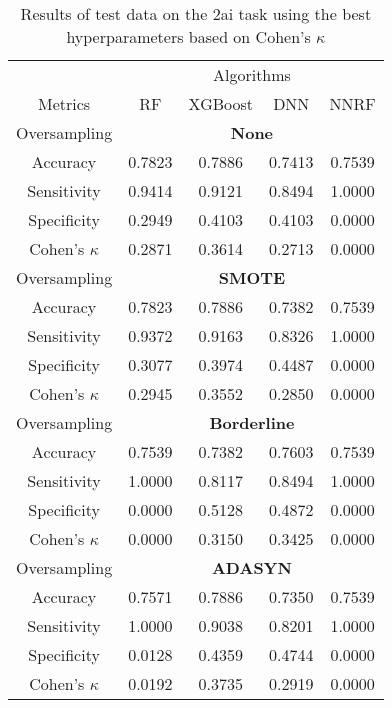 \begin{table}[!htb]
\centering
\caption{Results of test data on the 2ai task using the best hyperparameters based on Cohen's $\kappa$}
\label{tab:{task}_test_results}
\begin{tabular}{c | c c c c}
\hline
 & \multicolumn{4}{c}{Algorithms}\\ 
Metrics &RF & XGBoost & DNN & NNRF\\ 
\hline
Oversampling &\multicolumn{4}{|c}{\textbf{None}}\\ 
\hline
Accuracy & 0.7823 & 0.7886 & 0.7413 & 0.7539\\ 
Sensitivity & 0.9414 & 0.9121 & 0.8494 & 1.0000\\ 
Specificity & 0.2949 & 0.4103 & 0.4103 & 0.0000\\ 
Cohen's $\kappa$ & 0.2871 & 0.3614 & 0.2713 & 0.0000\\ 
\hline
Oversampling &\multicolumn{4}{|c}{\textbf{SMOTE}}\\ 
\hline
Accuracy & 0.7823 & 0.7886 & 0.7382 & 0.7539\\ 
Sensitivity & 0.9372 & 0.9163 & 0.8326 & 1.0000\\ 
Specificity & 0.3077 & 0.3974 & 0.4487 & 0.0000\\ 
Cohen's $\kappa$ & 0.2945 & 0.3552 & 0.2850 & 0.0000\\ 
\hline
Oversampling &\multicolumn{4}{|c}{\textbf{Borderline}}\\ 
\hline
Accuracy & 0.7539 & 0.7382 & 0.7603 & 0.7539\\ 
Sensitivity & 1.0000 & 0.8117 & 0.8494 & 1.0000\\ 
Specificity & 0.0000 & 0.5128 & 0.4872 & 0.0000\\ 
Cohen's $\kappa$ & 0.0000 & 0.3150 & 0.3425 & 0.0000\\ 
\hline
Oversampling &\multicolumn{4}{|c}{\textbf{ADASYN}}\\ 
\hline
Accuracy & 0.7571 & 0.7886 & 0.7350 & 0.7539\\ 
Sensitivity & 1.0000 & 0.9038 & 0.8201 & 1.0000\\ 
Specificity & 0.0128 & 0.4359 & 0.4744 & 0.0000\\ 
Cohen's $\kappa$ & 0.0192 & 0.3735 & 0.2919 & 0.0000\\ 
\hline
\end{tabular}
\end{table}

